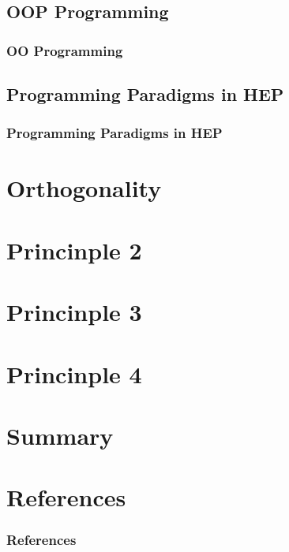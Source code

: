 \documentclass[9pt,dvips]{beamer}
\begin{document}
\subsection[OOP]{OOP Programming}
\begin{frame}
\frametitle{OO Programming}

\end{frame}

\subsection[OOP in HEP]{Programming Paradigms in HEP}
\begin{frame}
\frametitle{Programming Paradigms in HEP}

\end{frame}

\section{Orthogonality}

\section{Princinple 2}

\section{Princinple 3}

\section{Princinple 4}

\section{Summary}

\section{References}
\scriptsize
\begin{frame}
  \frametitle{References}
   
  
\end{frame}
\end{document}
